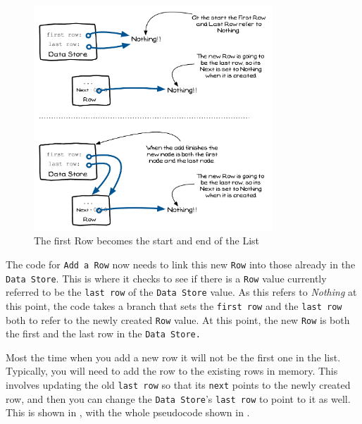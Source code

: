 \begin{figure}[htbp]
   \centering
   \includegraphics[width=0.80\textwidth]{./topics/dynamic-memory/diagrams/AddNode1} 
   \caption{The first Row becomes the start and end of the List}
   \label{fig:add-node-1}
\end{figure}

The code for \texttt{Add a Row} now needs to link this new \texttt{Row} into those already in the \texttt{Data Store}. This is where it checks to see if there is a \texttt{Row} value currently referred to be the \texttt{last row} of the \texttt{Data Store} value. As this refers to \emph{Nothing} at this point, the code takes a branch that sets the \texttt{first row} and the \texttt{last row} both to refer to the newly created \texttt{Row} value. At this point, the new \texttt{Row} is both the first and the last row in the \texttt{Data Store.}

Most the time when you add a new row it will not be the first one in the list. Typically, you will need to add the row to the existing rows in memory. This involves updating the old \texttt{last row} so that its \texttt{next} points to the newly created row, and then you can change the \texttt{Data Store}'s \texttt{last row} to point to it as well. This is shown in , with the whole pseudocode shown in .

